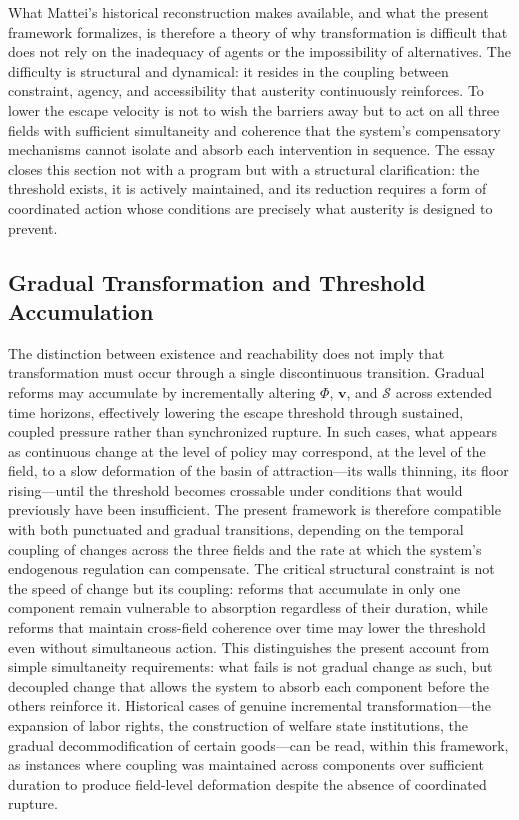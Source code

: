 \documentclass[11pt, a4paper]{article}
\begin{document}
What Mattei's historical reconstruction makes available, and what the present framework formalizes, is therefore a theory of why transformation is difficult that does not rely on the inadequacy of agents or the impossibility of alternatives. The difficulty is structural and dynamical: it resides in the coupling between constraint, agency, and accessibility that austerity continuously reinforces. To lower the escape velocity is not to wish the barriers away but to act on all three fields with sufficient simultaneity and coherence that the system's compensatory mechanisms cannot isolate and absorb each intervention in sequence. The essay closes this section not with a program but with a structural clarification: the threshold exists, it is actively maintained, and its reduction requires a form of coordinated action whose conditions are precisely what austerity is designed to prevent.

\subsection{Gradual Transformation and Threshold Accumulation}

The distinction between existence and reachability does not imply that transformation must occur through a single discontinuous transition. Gradual reforms may accumulate by incrementally altering $\Phi$, $\mathbf{v}$, and $\mathcal{S}$ across extended time horizons, effectively lowering the escape threshold through sustained, coupled pressure rather than synchronized rupture. In such cases, what appears as continuous change at the level of policy may correspond, at the level of the field, to a slow deformation of the basin of attraction---its walls thinning, its floor rising---until the threshold becomes crossable under conditions that would previously have been insufficient. The present framework is therefore compatible with both punctuated and gradual transitions, depending on the temporal coupling of changes across the three fields and the rate at which the system's endogenous regulation can compensate. The critical structural constraint is not the speed of change but its coupling: reforms that accumulate in only one component remain vulnerable to absorption regardless of their duration, while reforms that maintain cross-field coherence over time may lower the threshold even without simultaneous action. This distinguishes the present account from simple simultaneity requirements: what fails is not gradual change as such, but decoupled change that allows the system to absorb each component before the others reinforce it. Historical cases of genuine incremental transformation---the expansion of labor rights, the construction of welfare state institutions, the gradual decommodification of certain goods---can be read, within this framework, as instances where coupling was maintained across components over sufficient duration to produce field-level deformation despite the absence of coordinated rupture.
\end{document}
